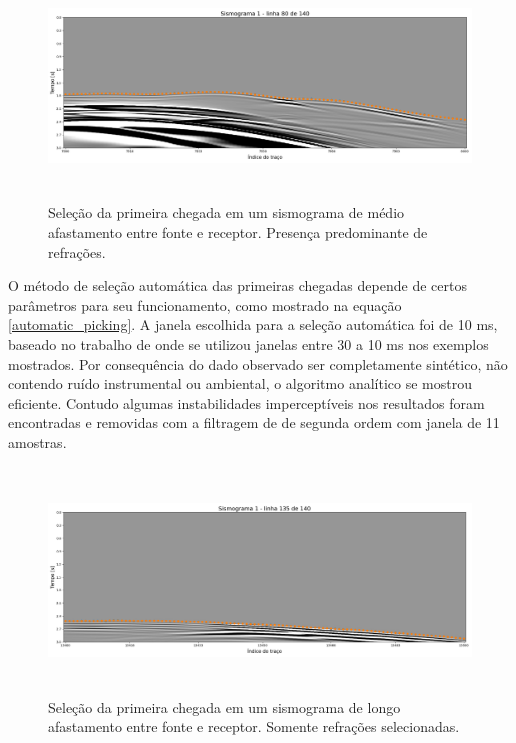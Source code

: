 \begin{figure}[H]
	\centering
	\includegraphics[width=16cm,height=6cm]{Imgs/Metodologia/linha80_sismo1.png}
	\caption{Seleção da primeira chegada em um sismograma de médio afastamento entre fonte e receptor. Presença predominante de refrações.}
	\label{fig:gather_picking_mid}	
\end{figure}

O método de seleção automática das primeiras chegadas depende de certos parâmetros para seu funcionamento, como mostrado na equação \ref{automatic_picking}. A janela escolhida para a seleção automática foi de 10 ms, baseado no trabalho de  onde se utilizou janelas entre 30 a 10 ms nos exemplos mostrados. Por consequência do dado observado ser completamente sintético, não contendo ruído instrumental ou ambiental, o algoritmo analítico se mostrou eficiente. Contudo algumas instabilidades imperceptíveis nos resultados foram encontradas e removidas com a filtragem de  de segunda ordem com janela de 11 amostras.   

\begin{figure}[H]
	\centering
	\includegraphics[width=16cm,height=6cm]{Imgs/Metodologia/linha135_sismo1.png}
	\caption{Seleção da primeira chegada em um sismograma de longo afastamento entre fonte e receptor. Somente refrações selecionadas.}
	\label{fig:gather_picking_far}	
\end{figure}

